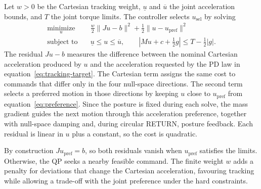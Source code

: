 \documentclass[11pt,a4paper]{article}
\begin{document}
Let $w>0$ be the Cartesian tracking weight, $\underline u$ and
$\overline u$ the joint acceleration bounds, and $T$ the joint torque
limits. The controller selects $u_{\mathrm{sel}}$ by solving
\begin{equation}
 \boxed{\begin{aligned}
 \underset{u}{\operatorname{minimize}}\quad&
 \tfrac{w}{2}\|Ju-b\|^2+\tfrac12\|u-u_{\mathrm{pref}}\|^2\\
 \text{subject to}\quad&
 \underline u\le u\le\overline u,\qquad
 |Mu+c+\tfrac12g|\le T-\tfrac12|g|.
 \end{aligned}}
 \label{eq:single-qp}
\end{equation}
The residual $Ju-b$ measures the difference between the nominal Cartesian
acceleration produced by $u$ and the acceleration requested by the PD law
in equation~\eqref{eq:tracking-target}. The Cartesian term assigns the same
cost to commands that differ only in the four null-space directions. The
second term selects a preferred motion in those directions by keeping
$u$ close to $u_{\mathrm{pref}}$ from equation~\eqref{eq:preference}.
Since the posture is fixed during each solve, the mass gradient guides
the next motion through this acceleration preference, together with
null-space damping and, during circular RETURN, posture feedback.
Each residual is linear in $u$ plus a constant, so the cost is quadratic.

By construction $Ju_{\mathrm{pref}}=b$, so both residuals vanish when
$u_{\mathrm{pref}}$ satisfies the limits. Otherwise, the QP seeks a nearby
feasible command. The finite weight $w$ adds a penalty for deviations that
change the Cartesian acceleration, favouring tracking while allowing a
trade-off with the joint preference under the hard constraints.
\end{document}
